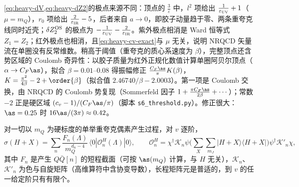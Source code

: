 \begin{example}[阈值处的单圈 $c_v$]\label{ex:heavy-cv}
\cref{eq:heavy-dV,eq:heavy-dZ2}的极点来源不同：顶点的 $\frac3\varepsilon$ 中，$l^2$ 项给出 $\frac1{\varepsilon_{\rm UV}}+1$（$\mu=m_Q$），$r_0$ 项给出 $\frac{2}{\varepsilon_{\rm IR}}-5$，后者来自 $a\to0$，即胶子动量趋于零、两条重夸克线同时近壳；$\delta Z_2^{\rm OS}$ 的极点为 $-\frac1{\varepsilon_{\rm UV}}-\frac2{\varepsilon_{\rm IR}}$。紫外极点相消是 Ward 恒等式 $Z_1=Z_2$；红外极点也相消，且\cref{eq:heavy-cv-exact}与 $\mu$ 无关，说明 NRQCD 矢量流在单圈没有反常维数。稍高于阈值（重夸克的质心系速度为 $\beta$），完整顶点还含势区域的 Coulomb 奇异性：以胶子质量为红外正规化数值计算单圈阿贝尔顶点（$\alpha\to C_F\as$），拟合 $\beta=0.01$--$0.08$ 得振幅修正 $\frac{C_F\as}{\pi}K(\beta)$，$K=\frac{\pi^2}{4\beta}-2+\order{\beta}$（拟合值 $2.46740/\beta-2.0003$）。第一项是 Coulomb 交换，由 NRQCD 的 Coulomb 势复现（Sommerfeld 因子 $1+\frac{\pi C_F\as}{2\beta}+\cdots$）；常数 $-2$ 正是硬区域 $(c_v-1)/(C_F\as/\pi)$（脚本 \texttt{s6\_\allowbreak threshold.py}）。修正很大：$\as=0.25$ 时 $16\as/(3\pi)\approx0.42$。
\end{example}

\begin{conjecture}\label{conj:heavy-nrqcd-production}
对一切以 $m_Q$ 为硬标度的单举重夸克偶素产生过程，对 $v$ 逐阶，
\begin{equation}\label{eq:heavy-nrqcd-prod}
\sigma(H+X)=\sum_n\frac{F_n(\Lambda)}{m_Q^{d_n-4}}\,\langle0|\mathcal O^H_n(\Lambda)|0\rangle,\qquad
\mathcal O^H_n=\chi^\dagger\mathcal K_n\psi\Big(\sum_X\sum_{m_J}|H+X\rangle\langle H+X|\Big)\psi^\dagger\mathcal K'_n\chi ,
\end{equation}
其中 $F_n$ 是产生 $Q\bar Q[n]$ 的短程截面（可按 $\as(m_Q)$ 计算，与 $H$ 无关），$\mathcal K_n$、$\mathcal K'_n$ 为色与自旋矩阵（高维算符中含协变导数），长程矩阵元是普适的，到 $v$ 的任一给定阶只有有限个\cite[第~VI.A~节，式~(6.4)]{BodwinBraatenLepage1995}。
\end{conjecture}


